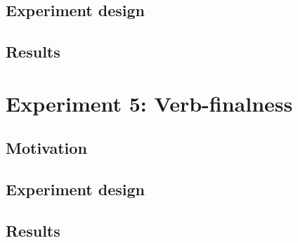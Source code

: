 \subsection{Experiment design}
\subsection{Results}

\section{Experiment 5: Verb-finalness}
\subsection{Motivation}
\subsection{Experiment design}
\subsection{Results}